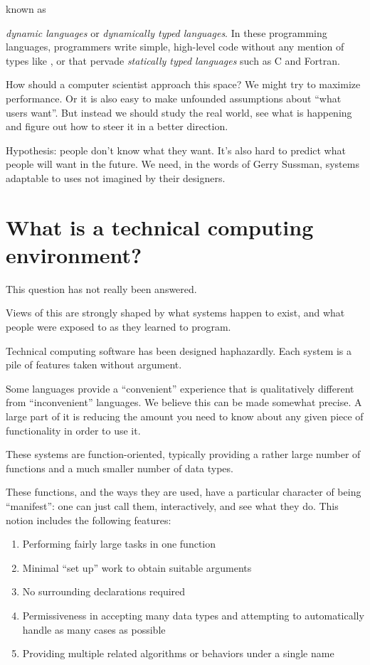 known as { {\it dynamic languages} or {\it dynamically typed languages}.
In these programming
languages, programmers write simple, high-level code without any
mention of types like ,  or  that
pervade {\it statically typed languages} such as  C and Fortran.



How should a computer scientist approach this space? We might try to
maximize performance. Or it is also easy to make unfounded assumptions about
``what users want''. But instead we should study the real world, see
what is happening and figure out how to steer it in a better direction.

Hypothesis: people don't know what they want. It's also hard to
predict what people will want in the future. We need, in the words
of Gerry Sussman, systems adaptable to uses not imagined by their
designers.

\section{What is a technical computing environment?}

This question has not really been answered.

Views of this are strongly shaped by what systems happen to exist,
and what people were exposed to as they learned to program.

Technical computing software has been designed haphazardly. Each system
is a pile of features taken without argument.


Some languages provide a ``convenient'' experience that is
qualitatively different from ``inconvenient'' languages. We believe
this can be made somewhat precise. A large part of it is reducing the
amount you need to know about any given piece of functionality in order
to use it.


These systems are function-oriented, typically providing a rather
large number of functions and a much smaller number of data types.

These functions, and the ways they are used, have a particular
character of being ``manifest'': one can just call them,
interactively, and see what they do. This notion includes the
following features:

\begin{singlespace}
\begin{enumerate}
\item Performing fairly large tasks in one function
\item Minimal ``set up'' work to obtain suitable arguments
\item No surrounding declarations required
\item Permissiveness in accepting many data types and attempting to
      automatically handle as many cases as possible
\item Providing multiple related algorithms or behaviors under a single name
\end{enumerate}
\end{singlespace}

}
